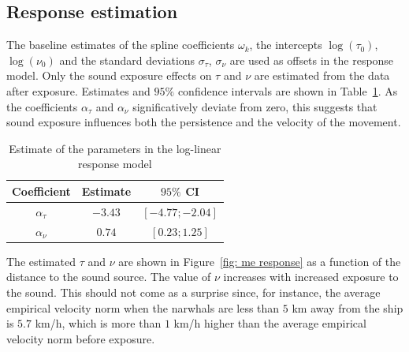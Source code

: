\documentclass[aoas]{imsart}
\theoremstyle{definition}
\theoremstyle{remark}
\theoremstyle{remark}
\newcommand {\1}{\mathbb{1}}
\begin{document}
\subsection{Response estimation}

The baseline estimates of the spline coefficients $\omega_k$, the intercepts $\log(\tau_0)$, $\log(\nu_0)$ and the standard deviations $\sigma_{\tau}$, $\sigma_{\nu}$ are used as offsets in the response model. Only the sound exposure effects on $\tau$ and $\nu$ are estimated from the data after exposure.
Estimates and $95\%$ confidence intervals are shown in Table~\ref{table: response estimations}. As the coefficients $\alpha_\tau$ and $\alpha_\nu$ significatively deviate from zero, this suggests that sound exposure influences both the persistence and the velocity of the movement.\\

\begin{table}[ht!]
	\centering
	\begin{tabular}{|c|c|c|}
		\hline
		Coefficient   & Estimate  & $95 \%$ CI \\
		\hline
		$\alpha_\tau$    & $-3.43$    &  $[-4.77; -2.04]$ \\
		$\alpha_\nu$  & $0.74$   &  $[0.23; 1.25]$\\
		\hline
	\end{tabular}
	\caption{Estimate of the parameters in the log-linear response model}
	\label{table: response estimations}
\end{table}



The estimated $\tau$ and $\nu$ are shown in Figure~\ref{fig: me response} as a function of the distance to the sound source. The value of $\nu$ increases with increased exposure to the sound. This should not come as a surprise since, for instance, the average empirical velocity norm when the narwhals are less than $5$ km away from the ship is $5.7$ km/h, which is more than $1$ km/h higher than the average empirical velocity norm before exposure. 
\end{document}
